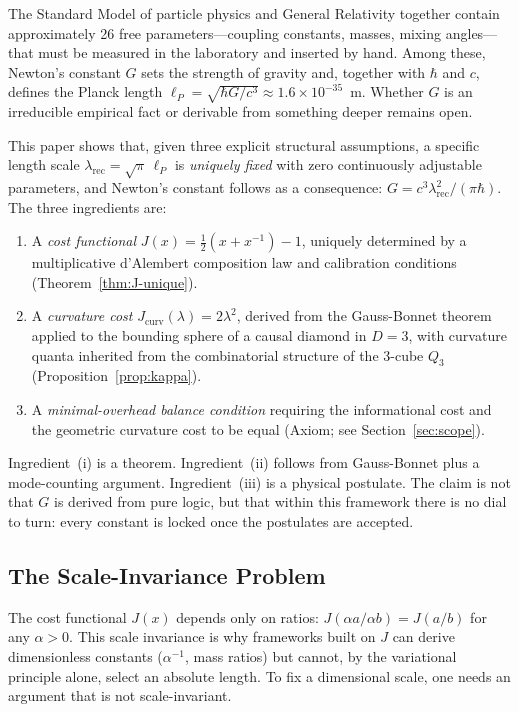 \documentclass[12pt]{article}
\theoremstyle{definition}
\theoremstyle{remark}
\begin{document}
The Standard Model of particle physics and General Relativity together
contain approximately 26 free parameters---coupling constants,
masses, mixing angles---that must be measured in the laboratory and
inserted by hand. Among these, Newton's constant $G$ sets the
strength of gravity and, together with $\hbar$ and $c$, defines the
Planck length $\ell_P = \sqrt{\hbar G/c^3} \approx
1.6 \times 10^{-35}$~m. Whether $G$ is an irreducible empirical
fact or derivable from something deeper remains open.

This paper shows that, given three explicit structural assumptions,
a specific length scale
$\lambda_{\mathrm{rec}} = \sqrt{\pi}\,\ell_P$ is \emph{uniquely
fixed} with zero continuously adjustable parameters, and Newton's
constant follows as a consequence:
$G = c^3 \lambda_{\mathrm{rec}}^2/(\pi\hbar)$.  The three
ingredients are:
\begin{enumerate}[label=(\roman*)]
  \item A \emph{cost functional} $J(x) = \frac{1}{2}(x + x^{-1}) - 1$,
    uniquely determined by a multiplicative d'Alembert composition law
    and calibration conditions (Theorem~\ref{thm:J-unique}).
  \item A \emph{curvature cost} $J_{\mathrm{curv}}(\lambda) =
    2\lambda^2$, derived from the Gauss-Bonnet theorem applied to the
    bounding sphere of a causal diamond in $D = 3$, with curvature
    quanta inherited from the combinatorial structure of the 3-cube
    $Q_3$ (Proposition~\ref{prop:kappa}).
  \item A \emph{minimal-overhead balance condition} requiring the
    informational cost and the geometric curvature cost to be equal
    (Axiom; see Section~\ref{sec:scope}).
\end{enumerate}
Ingredient~(i) is a theorem. Ingredient~(ii) follows from
Gauss-Bonnet plus a mode-counting argument. Ingredient~(iii) is a
physical postulate.  The claim is not that $G$ is derived from pure
logic, but that within this framework there is no dial to turn:
every constant is locked once the postulates are accepted.

\subsection{The Scale-Invariance Problem}

The cost functional $J(x)$ depends only on ratios: $J(\alpha a /
\alpha b) = J(a/b)$ for any $\alpha > 0$. This scale invariance is
why frameworks built on $J$ can derive dimensionless constants
($\alpha^{-1}$, mass ratios) but cannot, by the variational principle
alone, select an absolute length. To fix a dimensional scale, one
needs an argument that is not scale-invariant.
\end{document}
